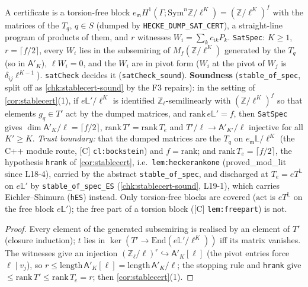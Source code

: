 \begin{definition}\label{chk:stablecert}
  \leanok
  A certificate is a torsion-free block $e_{\mathfrak m}H^1(\Gamma;\mathrm{Sym}^n\mathbb Z/\ell^K)=(\mathbb Z/\ell^K)^f$ with the matrices
  of the $T_q$, $q\in S$ (dumped by \texttt{HECKE\_DUMP\_SAT\_CERT}), a straight-line program of products of them, and
  $r$ witnesses $W_i=\sum_k c_{ik}P_k$. \texttt{SatSpec}: $K\ge1$, $r=\lceil f/2\rceil$, every $W_i$ lies in the subsemiring of
  $M_f(\mathbb Z/\ell^K)$ generated by the $T_q$ (so in $\mathsf A'_K$), $\ell W_i=0$, and the $W_i$ are in pivot form ($W_i$ at
  the pivot of $W_j$ is $\delta_{ij}\ell^{K-1}$). \texttt{satCheck} decides it (\texttt{satCheck\_sound}).
  \textbf{Soundness} (\texttt{stable\_of\_spec}, split off as \ref{chk:stablecert-sound} by the F3 repairs): in the setting of \ref{cor:stablecert}(1), if $e\mathbb L'/\ell^K$ is identified
  $\mathbb Z_\ell$-semilinearly with $(\mathbb Z/\ell^K)^f$ so that elements $g_q\in T'$ act by the dumped matrices, and
  $\mathrm{rank}\,e\mathbb L'=f$, then \texttt{SatSpec} gives $\dim\mathsf A'_K/\ell=\lceil f/2\rceil$, $\mathrm{rank}\,T'=\mathrm{rank}\,T_e$
  and $T'/\ell\to\mathsf A'_{K'}/\ell$ injective for all $K'\ge K$.
  \emph{Trust boundary:} that the dumped matrices are the $T_q$ on $e_{\mathfrak m}\mathbb L/\ell^K$ (the C++ module route,
  [C] \texttt{cl:bockstein}) and $f=\mathrm{rank}$; and $\mathrm{rank}\,T_e=\lceil f/2\rceil$, the hypothesis \texttt{hrank} of
  \ref{cor:stablecert}, i.e.\ \texttt{lem:heckerankone} (\textsf{proved\_mod\_lit} since L18-4), carried by the abstract
  \texttt{stable\_of\_spec}, and discharged at $T_e=eT^{\mathbb L}$ on $e\mathbb L'$ by \texttt{stable\_of\_spec\_ES}
  (\ref{chk:stablecert-sound}, L19-1), which carries Eichler--Shimura (\texttt{hES}) instead. Only torsion-free blocks are covered ($\mathrm{act}$ is $eT^{\mathbb L}$ on the free block $e\mathbb L'$); the free part of a torsion block ([C] \texttt{lem:freepart}) is not.
\end{definition}
\begin{proof}
  \leanok
  Every element of the generated subsemiring is realised by an element of $T'$ (closure induction); $t$ lies in
  $\ker(T'\to\mathrm{End}(e\mathbb L'/\ell^K))$ iff its matrix vanishes. The witnesses give an injection
  $(\mathbb Z_\ell/\ell)^r\hookrightarrow\mathsf A'_K[\ell]$ (the pivot entries force $\ell\mid v_j$), so
  $r\le\mathrm{length}\,\mathsf A'_K[\ell]=\mathrm{length}\,\mathsf A'_K/\ell$; the stopping rule and \texttt{hrank} give
  $\le\mathrm{rank}\,T'\le\mathrm{rank}\,T_e=r$; then \ref{cor:stablecert}(1).
\end{proof}

